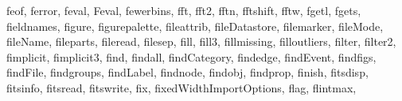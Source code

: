 {{        feof,%
        ferror,%
        feval,%
        Feval,%
        fewerbins,%
        fft,%
        fft2,%
        fftn,%
        fftshift,%
        fftw,%
        fgetl,%
        fgets,%
        fieldnames,%
        figure,%
        figurepalette,%
        fileattrib,%
        fileDatastore,%
        filemarker,%
        fileMode,%
        fileName,%
        fileparts,%
        fileread,%
        filesep,%
        fill,%
        fill3,%
        fillmissing,%
        filloutliers,%
        filter,%
        filter2,%
        fimplicit,%
        fimplicit3,%
        find,%
        findall,%
        findCategory,%
        findedge,%
        findEvent,%
        findfigs,%
        findFile,%
        findgroups,%
        findLabel,%
        findnode,%
        findobj,%
        findprop,%
        finish,%
        fitsdisp,%
        fitsinfo,%
        fitsread,%
        fitswrite,%
        fix,%
        fixedWidthImportOptions,%
        flag,%
        flintmax,%
}}

